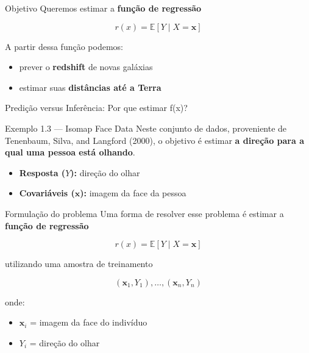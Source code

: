 \documentclass[
  ignorenonframetext,
  aspectratio=169,
]{beamer}
\providecommand{\tightlist}{%
  \setlength{\itemsep}{0pt}\setlength{\parskip}{0pt}}
\begin{document}
\begin{frame}
\begin{block}{Objetivo}
\label{objetivo-1}
Queremos estimar a \textbf{função de regressão}

\[
r(x)=\mathbb{E}[Y \mid X=\mathbf{x}]
\]

A partir dessa função podemos:

\begin{itemize}
\tightlist
\item
  prever o \textbf{redshift} de novas galáxias
\item
  estimar suas \textbf{distâncias até a Terra}
\end{itemize}
\end{block}
\end{frame}

\begin{frame}{Predição versus Inferência: Por que estimar f(x)?}
\label{prediuxe7uxe3o-versus-inferuxeancia-por-que-estimar-fx-2}
\begin{block}{Exemplo 1.3 --- Isomap Face Data}
\label{exemplo-1.3-isomap-face-data}
Neste conjunto de dados, proveniente de Tenenbaum, Silva, and Langford
(2000), o objetivo é estimar \textbf{a direção para a qual uma pessoa
está olhando}.

\begin{itemize}
\tightlist
\item
  \textbf{Resposta (\(Y\)):} direção do olhar\\
\item
  \textbf{Covariáveis (\(\mathbf{x}\)):} imagem da face da pessoa
\end{itemize}
\end{block}
\end{frame}

\begin{frame}
\begin{block}{Formulação do problema}
\label{formulauxe7uxe3o-do-problema}
Uma forma de resolver esse problema é estimar a \textbf{função de
regressão}

\[
r(x) = \mathbb{E}[Y \mid X = \mathbf{x}]
\]

utilizando uma amostra de treinamento

\[
(\mathbf{x}_1,Y_1),\ldots,(\mathbf{x}_n,Y_n)
\]

onde:

\begin{itemize}
\tightlist
\item
  \(\mathbf{x}_i\) = imagem da face do indivíduo\\
\item
  \(Y_i\) = direção do olhar
\end{itemize}
\end{block}
\end{frame}
\end{document}
